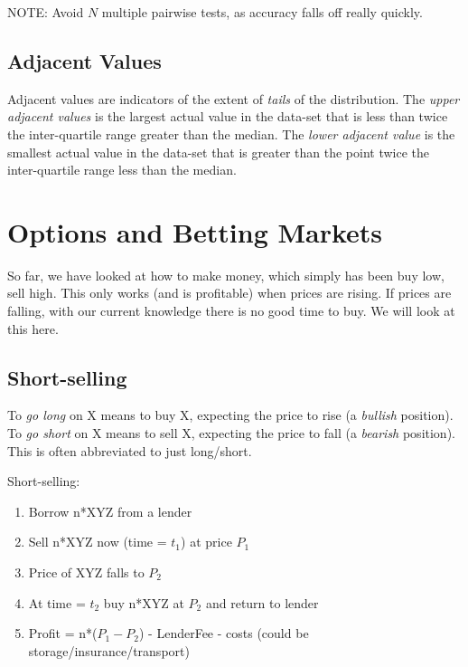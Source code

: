 \documentclass[11pt,a4paper,titlepage,dvipsnames,cmyk]{scrartcl}
\begin{document}
NOTE: Avoid $N$ multiple pairwise tests, as accuracy falls off really quickly.

\subsection{Adjacent Values}
Adjacent values are indicators of the extent of \textit{tails} of the distribution. The \textit{upper adjacent values} is the largest actual value in the data-set that is less than twice the inter-quartile range greater than the median. The \textit{lower adjacent value} is the smallest actual value in the data-set that is greater than the point twice the inter-quartile range less than the median.

\section{Options and Betting Markets}
So far, we have looked at how to make money, which simply has been buy low, sell high. This only works (and is profitable) when prices are rising. If prices are falling, with our current knowledge there is no good time to buy. We will look at this here.

\subsection{Short-selling}
To \textit{go long} on X means to buy X, expecting the price to rise (a \textit{bullish} position). To \textit{go short} on X means to sell X, expecting the price to fall (a \textit{bearish} position). This is often abbreviated to just long/short.

Short-selling:
\begin{enumerate}
\item Borrow n*XYZ from a lender
\item Sell n*XYZ now (time = $t_1$) at price $P_1$
\item Price of XYZ falls to $P_2$
\item At time = $t_2$ buy n*XYZ at $P_2$ and return to lender
\item Profit = n*($P_1 - P_2$) - LenderFee - costs (could be storage/insurance/transport)
\end{enumerate}
\end{document}
